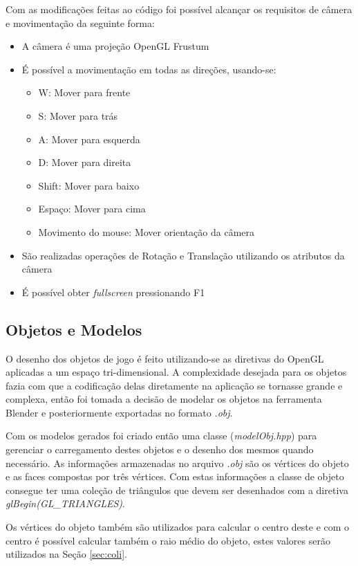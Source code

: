 \documentclass{article}
\begin{document}
Com as modificações feitas ao código foi possível alcançar os requisitos de câmera e movimentação da seguinte forma:

\begin{itemize}
    \item A câmera é uma projeção OpenGL Frustum
    \item É possível a movimentação em todas as direções, usando-se:
    \begin{itemize}
        \item W: Mover para frente
        \item S: Mover para trás
        \item A: Mover para esquerda
        \item D: Mover para direita
        \item Shift: Mover para baixo
        \item Espaço: Mover para cima
        \item Movimento do mouse: Mover orientação da câmera
    \end{itemize}
    \item São realizadas operações de Rotação e Translação utilizando os atributos da câmera
    \item É possível obter \textit{fullscreen} pressionando F1
\end{itemize}


\subsection{Objetos e Modelos}
\label{sec:modelObj}

O desenho dos objetos de jogo é feito utilizando-se as diretivas do OpenGL aplicadas a um espaço tri-dimensional. A complexidade desejada para os objetos fazia com que a codificação delas diretamente na aplicação se tornasse grande e complexa, então foi tomada a decisão de modelar os objetos na ferramenta Blender \citep{BLENDER} e posteriormente exportadas no formato \textit{.obj}.

Com os modelos gerados foi criado então uma classe (\textit{modelObj.hpp}) para gerenciar o carregamento destes objetos e o desenho dos mesmos quando necessário. As informações armazenadas no arquivo \textit{.obj} são os vértices do objeto e as faces compostas por três vértices. Com estas informações a classe de objeto consegue ter uma coleção de triângulos que devem ser desenhados com a diretiva \textit{glBegin(GL\_TRIANGLES)}.

Os vértices do objeto também são utilizados para calcular o centro deste e com o centro é possível calcular também o raio médio do objeto, estes valores serão utilizados na Seção \ref{sec:coli}.
\end{document}
